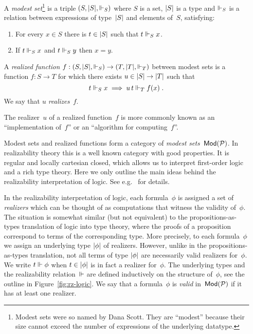\begin{definition}
  A \emph{modest set}\footnote{Modest sets were so named by Dana
    Scott. They are ``modest'' because their size cannot exceed the
    number of expressions of the underlying datatype.} is a triple
  $(S, |S|, {\Vdash_S})$ where $S$ is a set, $|S|$ is a type and
  $\Vdash_S$ is a relation between expressions of type~$|S|$ and
  elements of~$S$, satisfying:
  \begin{enumerate}
  \item For every $x \in S$ there is $t \in |S|$ such that $t \Vdash_S
    x$.
  \item If $t \Vdash_S x$ and $t \Vdash_S y$ then $x = y$.
  \end{enumerate}
  A \emph{realized function} $f : (S, |S|, {\Vdash_S}) \to (T, |T|,
  {\Vdash_T})$ between modest sets is a function $f : S \to T$ for which
  there exists $u \in |S| \to |T|$ such that
  \begin{equation*}
    t \Vdash_S x \implies u\,t \Vdash_T f(x) \;.
  \end{equation*}
  We say that $u$ \emph{realizes}~$f$.
\end{definition}

The realizer~$u$ of a realized function~$f$ is more commonly known as
an ``implementation of~$f$'' or an ``algorithm for computing~$f$''.

Modest sets and realized functions form a category of \emph{modest
  sets~$\mathsf{Mod}(\mathcal{P})$}. In realizability theory this is a well known
category with good properties. It is regular and locally cartesian
closed, which allows us to interpret first-order logic and a rich type
theory. Here we only outline the main ideas behind the realizability
interpretation of logic. See e.g.~\cite{Bauer:00} for details.

In the realizability interpretation of logic, each formula~$\phi$ is
assigned a set of \emph{realizers} which can be thought of as
computations that witness the validity of~$\phi$. The situation is
somewhat similar (but not equivalent) to the propositions-as-types
translation of logic into type theory, where the proofs of a
proposition correspond to terms of the corresponding type. More
precisely, to each formula~$\phi$ we assign an underlying type
$|\phi|$ of realizers. However, unlike in the propositions-as-types
translation, not all terms of type $|\phi|$ are necessarily valid
realizers for~$\phi$. We write $t \Vdash \phi$ when $t \in |\phi|$ is
in fact a realizer for~$\phi$. The underlying types and the
realizability relation~$\Vdash$ are defined inductively on the structure
of~$\phi$, see the outline in Figure~\ref{fig:rz-logic}. We say that a
formula~$\phi$ is \emph{valid} in~$\mathsf{Mod}(\mathcal{P})$ if it has at least one
realizer.

